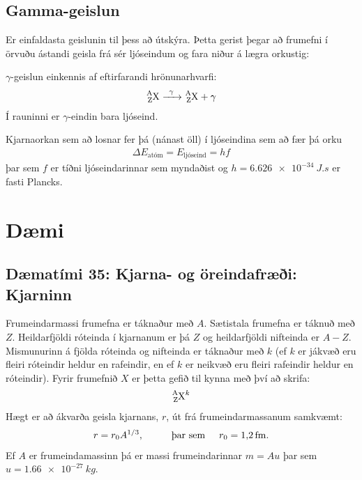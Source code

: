 \ifdefined \wholebook \else\documentclass[oneside]{book}\usepackage{EdlBook}\graphicspath{{figures/}}
\begin{document}
\subsection{Gamma-geislun}

Er einfaldasta geislunin til þess að útskýra. Þetta gerist þegar að frumefni í örvuðu ástandi geisla frá sér ljóseindum og fara niður á lægra orkustig:

\begin{tcolorbox}
\begin{definition}
$\gamma$-geislun einkennis af eftirfarandi hrönunarhvarfi:
\begin{align*}
    \ce{^{A}_{Z}X ->[\gamma] ^{A}_{Z}X + \gamma}
\end{align*}
Í rauninni er $\gamma$-eindin bara ljóseind.
\end{definition}
\end{tcolorbox}
Kjarnaorkan sem að losnar fer þá (nánast öll) í ljóseindina sem að fær þá orku
\begin{align*}
    \Delta E_{\text{atóm}} = E_{\text{ljóseind}} = hf
\end{align*}
þar sem $f$ er tíðni ljóseindarinnar sem myndaðist og $h = \SI{6.626e-34}{J.s}$ er fasti Plancks.

\newpage

\section{Dæmi}

\subsection*{Dæmatími 35: Kjarna- og öreindafræði: Kjarninn}

\begin{tcolorbox}
Frumeindarmassi frumefna er táknaður með $A$. Sætistala frumefna er táknuð með $Z$. Heildarfjöldi róteinda í kjarnanum er þá $Z$ og heildarfjöldi nifteinda er $A-Z$. Mismunurinn á fjölda róteinda og nifteinda er táknaður með $k$ (ef $k$ er jákvæð eru fleiri róteindir heldur en rafeindir, en ef $k$ er neikvæð eru fleiri rafeindir heldur en róteindir). Fyrir frumefnið $X$ er þetta gefið til kynna með því að skrifa:
\begin{align*}
    \ce{^{A}_{Z}X^{k}}
\end{align*}
Hægt er að ákvarða geisla kjarnans, $r$, út frá frumeindarmassanum samkvæmt:
\begin{align*}
    r = r_0A^{1/3}, \hspace{1cm} \text{þar sem} \hspace{0.5cm} r_0 = \SI{1.2}{fm}.
\end{align*}
Ef $A$ er frumeindamassinn þá er massi frumeindarinnar $m = Au$ þar sem $u = \SI{1.66e-27}{kg}$.
\end{tcolorbox}
\end{document}
